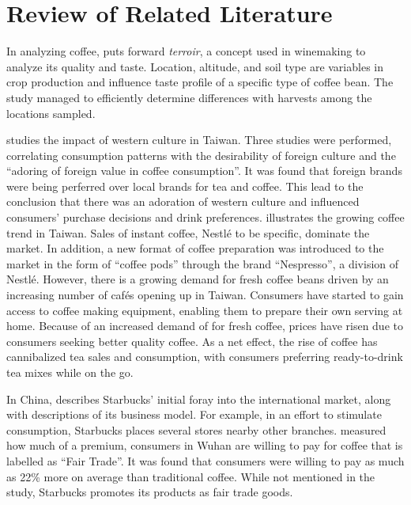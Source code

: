 \section{Review of Related Literature}

In analyzing coffee, \autocite{silva_characterization_2014} puts forward
\emph{terroir}, a concept used in winemaking to analyze its quality and taste.
Location, altitude, and soil type are variables in crop production and influence
taste profile of a specific type of coffee bean. The study managed to
efficiently determine differences with harvests among the locations sampled.

\autocite{su_impact_2006} studies the impact of western culture in Taiwan. Three
studies were performed, correlating consumption patterns with the desirability
of foreign culture and the ``adoring of foreign value in coffee consumption''.
It was found that foreign brands were being perferred over local brands for tea
and coffee. This lead to the conclusion that there was an adoration of western
culture and influenced consumers' purchase decisions and drink preferences.
\autocite{euromonitor_international_coffee_2015} illustrates the growing coffee
trend in Taiwan. Sales of instant coffee, Nestlé to be specific, dominate the
market. In addition, a new format of coffee preparation was introduced to the
market in the form of ``coffee pods'' through the brand ``Nespresso'', a
division of Nestlé. However, there is a growing demand for fresh coffee beans
driven by an increasing number of cafés opening up in Taiwan. Consumers have
started to gain access to coffee making equipment, enabling them to prepare
their own serving at home. Because of an increased demand of for fresh coffee,
prices have risen due to consumers seeking better quality coffee. As a net
effect, the rise of coffee has cannibalized tea sales and consumption, with
consumers preferring ready-to-drink tea mixes while on the go.

In China, \autocite{harrison_exporting_2005} describes Starbucks' initial foray
into the international market, along with descriptions of its business model.
For example, in an effort to stimulate consumption, Starbucks places several
stores nearby other branches. \autocite{yang_consumer_2012} measured how much of
a premium, consumers in Wuhan are willing to pay for coffee that is labelled as
``Fair Trade''. It was found that consumers were willing to pay as much as 22\%
more on average than traditional coffee. While not mentioned in the study,
Starbucks promotes its products as fair trade goods.
